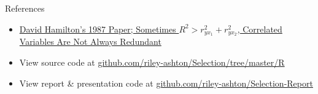 \documentclass[ignorenonframetext,]{beamer}
\providecommand{\tightlist}{%
  \setlength{\itemsep}{0pt}\setlength{\parskip}{0pt}}
\begin{document}
\begin{frame}{References}

\begin{itemize}
\tightlist
\item
  \href{https://www.researchgate.net/profile/David_Hamilton23/publication/272559796_Sometimes_R_2_r_2_yx_1_r_2_yx_2_Correlated_Variables_Are_Not_Always_Redundant/links/557825c108ae753637548c1b.pdf}{David
  Hamilton's 1987 Paper; Sometimes \(R^2 > r^2_{yx_1} + r^2_{yx_2}\),
  Correlated Variables Are Not Always Redundant}
\item
  View source code at
  \href{https://github.com/riley-ashton/Selection/tree/master/R}{github.com/riley-ashton/Selection/tree/master/R}
\item
  View report \& presentation code at
  \href{httpsgithub.com/riley-ashton/Selection-Report}{github.com/riley-ashton/Selection-Report}
\end{itemize}

\end{frame}
\end{document}
